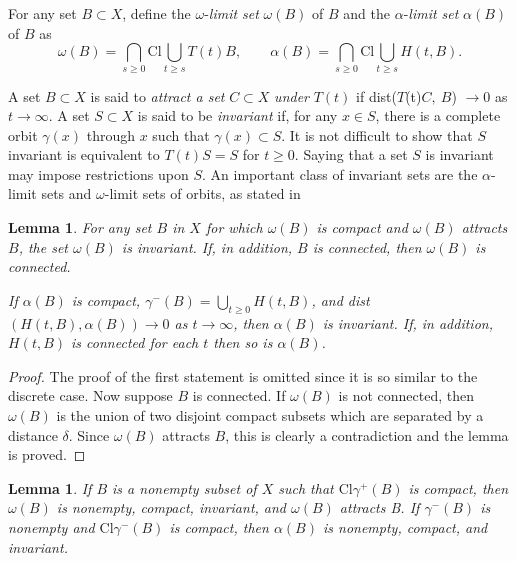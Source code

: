 \documentclass{surv-l}
\theoremstyle{plain}
\newtheorem{lemma}[theorem]{Lemma}
\theoremstyle{definition}
\numberwithin{equation}{section}
\numberwithin{figure}{chapter}
\begin{document}
For any set $B\subset X$, define the $\omega$-\emph{limit set} $\omega(B)$ of $B$ and the $\alpha$-\emph{limit set} $\alpha(B)$ of $B$ as
\begin{equation*}
\omega(B)=\bigcap_{s\geq 0}\mathrm{Cl} \bigcup_{t\geq s}T(t) B,\quad\quad \alpha(B)=\bigcap_{s\geq 0} \mathrm{Cl} \bigcup_{t\geq s}H(t, B).
\end{equation*}

A set $B\subset X$ is said to \emph{attract a set} $C\subset X$ \emph{under} $T(t)$ if dist($T$(t)$C,\ B$) $\rightarrow 0$ as $ t\rightarrow\infty$. A set $S\subset X$ is said to be \emph{invariant} if, for any $x\in S$, there is a complete orbit $\gamma(x)$ through $x$ such that $\gamma(x)\subset S$. It is not difficult to show that $S$ invariant is equivalent to $T(t)S=S$ for $t\geq 0$. Saying that a set $S$ is invariant may impose restrictions upon $S$. An important class of invariant sets are the $\alpha$-limit sets and $\omega$-limit sets of orbits, as stated in

\begin{lemma}\label{lem3.1.1} For any set $B$ in $X$ for which $\omega(B)$ is compact and $\omega(B)$ attracts $B$, the set $\omega(B)$ is invariant. If, in addition, $B$ is connected, then $\omega(B)$ is connected.

If $\alpha(B)$ is compact, $\gamma^{-}(B)=\bigcup_{t\geq 0}H(t,B)$, and dist\,$(H(t, B),\alpha(B))\rightarrow 0$ as $ t\rightarrow\infty$, then $\alpha(B)$ is invariant. If, in addition, $H(t, B)$ is connected for each $t$ then so is $\alpha(B)$.
\end{lemma}

\begin{proof} The proof of the first statement is omitted since it is so similar to the discrete case. Now suppose $B$ is connected. If $\omega(B)$ is not connected, then $\omega(B)$ is the union of two disjoint compact subsets which are separated by a distance $\delta$. Since $\omega(B)$ attracts $B$, this is clearly a contradiction and the lemma is proved.
\end{proof}

\begin{lemma}\label{lem3.1.2} If $B$ is a nonempty subset of $X$ such that $\mathrm{Cl}\gamma^{+}(B)$ is compact, then $\omega(B)$ is nonempty, compact, invariant, and $\omega(B)$ attracts B. If $\gamma^{-}(B)$ is nonempty and $\mathrm{Cl}\gamma^{-}(B)$ is compact, then $\alpha(B)$ is nonempty, compact, and invariant.
\end{lemma}
\end{document}
